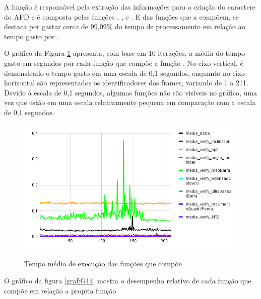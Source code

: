 A função  é responsável pela extração das informações para a criação do caractere do AFD e é composta pelas funções , ,  e . E das funções que a compõem,  se destaca por gastar cerca de 99,09\% do tempo de processamento em relação ao tempo gasto por .


O gráfico da Figura \ref{graf:G13} apresenta, com base em 10 iterações, a média do tempo gasto em segundos por cada função que compõe a função . No eixo vertical, é demonstrado o tempo gasto em uma escala de 0,1 segundos, enquanto no eixo horizontal são representados os identificadores dos frames, variando de 1 a 211. Devido à escala de 0,1 segundos, algumas funções não são visíveis no gráfico, uma vez que estão em uma escala relativamente pequena em comparação com a escala de 0,1 segundos.

\begin{figure}[H]
	\centering
	\caption{Tempo médio de execução das funções que compõe }
	\includegraphics[scale=0.7]{figuras/grafico/comp_process_cell_2.png}
	\label{graf:G13}
\end{figure}


O gráfico da figura \ref{graf:G14} mostra o desempenho relativo de cada função que compõe  em relação a propria função 

